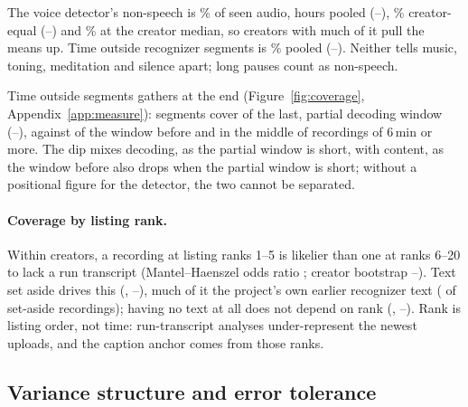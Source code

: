 The voice detector's non-speech is \NonSpeechPooledPct\% of seen audio, hours pooled
(\NonSpeechPooledLo--\NonSpeechPooledHi), \NonSpeechCreatorPct\% creator-equal (\NonSpeechCreatorLo--\NonSpeechCreatorHi)
and \NonSpeechMedianPct\% at the creator median, so creators with much of it pull the means up. Time outside recognizer
segments is \OutsideSegPooledPct\% pooled (\OutsideSegPooledLo--\OutsideSegPooledHi). Neither tells music, toning,
meditation and silence apart; long pauses count as non-speech.

Time outside segments gathers at the end (Figure~\ref{fig:coverage}, Appendix~\ref{app:measure}): segments cover \LastPartialCoverage{} of the
last, partial decoding window (\LastPartialCoverageLo--\LastPartialCoverageHi), against \WindowBeforeCoverage{} of the
window before and \MiddleCoverage{} in the middle of recordings of 6\,min or more. The dip mixes decoding, as the
partial window is short, with content, as the window before also drops when the partial window is short; without a
positional figure for the detector, the two cannot be separated.

\paragraph{Coverage by listing rank.}
\label{sec:coverage}
Within creators, a recording at listing ranks 1--5 is likelier than one at ranks 6--20 to lack a run transcript
(Mantel--Haenszel odds ratio \OrNotTranscribed; creator bootstrap \OrNotTranscribedLo--\OrNotTranscribedHi). Text set
aside drives this (\OrOtherText, \OrOtherTextLo--\OrOtherTextHi), much of it the project's own earlier recognizer text
(\NOwnEarlierAsr{} of \NSetAside{} set-aside recordings); having no text at all does not depend on rank (\OrNoText,
\OrNoTextLo--\OrNoTextHi). Rank is listing order, not time: run-transcript analyses under-represent the newest uploads,
and the caption anchor comes from those ranks.

\subsection{Variance structure and error tolerance}
\label{sec:variance}

